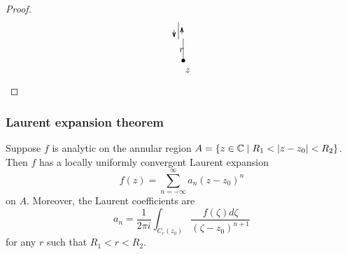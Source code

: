 \documentclass[12pt]{article}
\begin{document}
\begin{proof}
\[\begin{tikzpicture}[x=0.75pt,y=0.75pt,yscale=-.6,xscale=.6]
        \draw    (263.02,62.83) -- (263.02,113.43) ;
        \draw [shift={(263.02,113.43)}, rotate = 90] [color=black  ][fill=black  ][line width=0.75]      (0, 0) circle [x radius= 3.35, y radius= 3.35]   ;
        \draw    (252,25) -- (252,64.26) ;
        \draw    (242,42.64) -- (242,57.64) ;
        \draw [shift={(242,59.64)}, rotate = 270] [color=black  ][line width=0.75]    (10.93,-3.29) .. controls (6.95,-1.4) and (3.31,-0.3) .. (0,0) .. controls (3.31,0.3) and (6.95,1.4) .. (10.93,3.29)   ;
        \draw    (260,52.64) -- (260,39.64) ;
        \draw [shift={(260,37.64)}, rotate = 90] [color=black  ][line width=0.75]    (10.93,-3.29) .. controls (6.95,-1.4) and (3.31,-0.3) .. (0,0) .. controls (3.31,0.3) and (6.95,1.4) .. (10.93,3.29)   ;
        
        \draw (265.21,129.09) node [anchor=north west][inner sep=0.75pt]    {$z$};
        \draw (251.95,82.47) node [anchor=north west][inner sep=0.75pt]    {$r$};
        
        
        \end{tikzpicture}
        \]
\end{proof}

\subsubsection{Laurent expansion theorem}
 Suppose $f$ is analytic on the annular region $A=\{z\in \C\mid R_1<|z-z_0|<R_2\}$. Then $f$ has a locally uniformly convergent Laurent expansion $$
f(z)=\sum_{n=-\infty}^{\infty} a_n\left(z-z_0\right)^n
$$
on $A$. Moreover, the Laurent coefficients are
$$
a_n=\frac{1}{2 \pi i} \int_{C_r\left(z_0\right)} \frac{f(\zeta) d \zeta}{\left(\zeta-z_0\right)^{n+1}}
$$
for any $r$ such that $R_1<r<R_2$.
\end{document}
